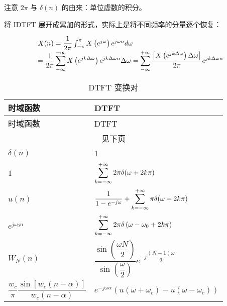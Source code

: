 \documentclass[cn,11pt,chinese,black,simple]{elegantbook}
\begin{document}
注意  \(2\pi\) 与 \(\delta(n)\) 的由来：单位虚数的积分。

将 IDTFT 展开成累加的形式，实际上是将不同频率的分量逐个恢复：

\begin{align*}
    \begin{array}{l}
    X(n)=\dfrac{1}{2 \pi} \int_{-\pi}^{\pi} X\left(e^{j \omega}\right) e^{j \omega n} d \omega \\
    =\dfrac{1}{2 \pi} \displaystyle\sum_{-\infty}^{+\infty} X\left(e^{j k \Delta \omega}\right) e^{j k \Delta \omega n} \Delta \omega=\displaystyle\sum_{-\infty}^{+\infty} \dfrac{\left[X\left(e^{j k \Delta \omega}\right) \Delta \omega\right]}{2 \pi} e^{j k \Delta \omega n}
    \end{array}
\end{align*}



\begin{longtable}{ll} 
    \caption{DTFT 变换对} \\ 
    \toprule
    时域函数 & DTFT  \\
    \midrule
    \endfirsthead
    
    \toprule
    时域函数 & DTFT  \\
    \midrule
    \endhead 
  
    \hline
    \multicolumn{2}{c}{见下页}\\   \bottomrule
    \endfoot
  
    \bottomrule
    \endlastfoot
    \(\delta(n)\) & 1\\
    \(1\) & \(\displaystyle\sum_{k=-\infty}^{+\infty} 2 \pi \delta(\omega+2 k \pi)\) \\ 
    \(u(n)\) & \(\dfrac{1}{1-e^{-j \omega}}+\displaystyle\sum_{k=-\infty}^{+\infty} \pi \delta(\omega+2 k \pi)\)  \\
    \(e^{j\omega_0 n}\) & \(
        \displaystyle\sum_{k=-\infty}^{+\infty} 2 \pi \delta\left(\omega-\omega_{0}+2 k \pi\right)
        \)\\
    \(W_N(n)\) & \(\dfrac{\sin \left(\dfrac{\omega N}{2}\right)}{\sin \left(\dfrac{\omega}{2}\right)} e^{-j \dfrac{(N-1) \omega}{2}}\) \\
    \(\dfrac{w_{c}}{\pi} \dfrac{\sin \left[w_{c}(n-\alpha)\right]}{w_{c}(n-\alpha)}\)  & \(e^{-j\omega\alpha} (u(\omega+\omega_c) - u(\omega-\omega_c))\)\\ 
\end{longtable}
\end{document}
